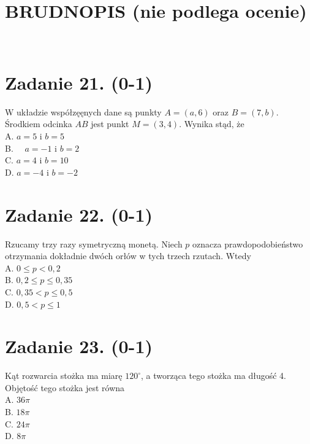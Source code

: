 \documentclass[10pt]{article}
\begin{document}
\section*{BRUDNOPIS (nie podlega ocenie)}
\(\qquad\)

\section*{Zadanie 21. (0-1)}
W układzie współzęęnych dane są punkty \(A=(a, 6)\) oraz \(B=(7, b)\). Środkiem odcinka \(A B\) jest punkt \(M=(3,4)\). Wynika stąd, że\\
A. \(a=5\) i \(b=5\)\\
B. \(\quad a=-1\) i \(b=2\)\\
C. \(a=4\) i \(b=10\)\\
D. \(a=-4\) i \(b=-2\)

\section*{Zadanie 22. (0-1)}
Rzucamy trzy razy symetryczną monetą. Niech \(p\) oznacza prawdopodobieństwo otrzymania dokładnie dwóch orłów w tych trzech rzutach. Wtedy\\
A. \(0 \leq p<0,2\)\\
B. \(0,2 \leq p \leq 0,35\)\\
C. \(0,35<p \leq 0,5\)\\
D. \(0,5<p \leq 1\)

\section*{Zadanie 23. (0-1)}
Kąt rozwarcia stożka ma miarę \(120^{\circ}\), a tworząca tego stożka ma długość 4. Objętość tego stożka jest równa\\
A. \(36 \pi\)\\
B. \(18 \pi\)\\
C. \(24 \pi\)\\
D. \(8 \pi\)
\end{document}
